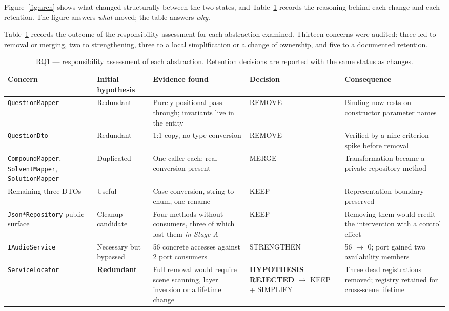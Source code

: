 \documentclass{sbc2019}%
\begin{document}
Figure~\ref{fig:arch} shows what changed structurally between the two states,
and Table~\ref{tab:rq1} records the reasoning behind each change and each
retention. The figure answers \emph{what} moved; the table answers \emph{why}.

Table~\ref{tab:rq1} records the outcome of the responsibility assessment for
each abstraction examined. Thirteen concerns were audited: three led to removal or
merging, two to strengthening, three to a local simplification or a change
of ownership, and five to a documented retention.

\begin{table}[!tp]
\centering
\caption{RQ1 --- responsibility assessment of each abstraction. Retention
decisions are reported with the same status as changes.}\label{tab:rq1}
\small
\begin{tabular}{p{}p{}p{}p{}p{}}
\toprule
\textbf{Concern} & \textbf{Initial hypothesis} & \textbf{Evidence found} & \textbf{Decision} & \textbf{Consequence} \\
\midrule
\texttt{QuestionMapper} & Redundant & Purely positional pass-through; invariants live in the entity & REMOVE & Binding now rests on constructor parameter names \\
\addlinespace
\texttt{QuestionDto} & Redundant & 1:1 copy, no type conversion & REMOVE & Verified by a nine-criterion spike before removal \\
\addlinespace
\texttt{CompoundMapper}, \texttt{SolventMapper}, \texttt{SolutionMapper} & Duplicated & One caller each; real conversion present & MERGE & Transformation became a private repository method \\
\addlinespace
Remaining three DTOs & Useful & Case conversion, string-to-enum, one rename & KEEP & Representation boundary preserved \\
\addlinespace
\texttt{Json*Repository} public surface & Cleanup candidate & Four methods without consumers, three of which lost them \emph{in Stage A} & KEEP & Removing them would credit the intervention with a control effect \\
\addlinespace
\texttt{IAudioService} & Necessary but bypassed & 56 concrete accesses against 2 port consumers & STRENGTHEN & 56 $\rightarrow$ 0; port gained two availability members \\
\addlinespace
\texttt{ServiceLocator} & \textbf{Redundant} & Full removal would require scene scanning, layer inversion or a lifetime change & \textbf{HYPOTHESIS REJECTED} $\rightarrow$ KEEP + SIMPLIFY & Three dead registrations removed; registry retained for cross-scene lifetime \\

\end{tabular}
\end{table}
\end{document}
